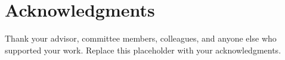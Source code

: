 \chapter*{Acknowledgments}

Thank your advisor, committee members, colleagues, and anyone else who supported your work. Replace this placeholder with your acknowledgments.
